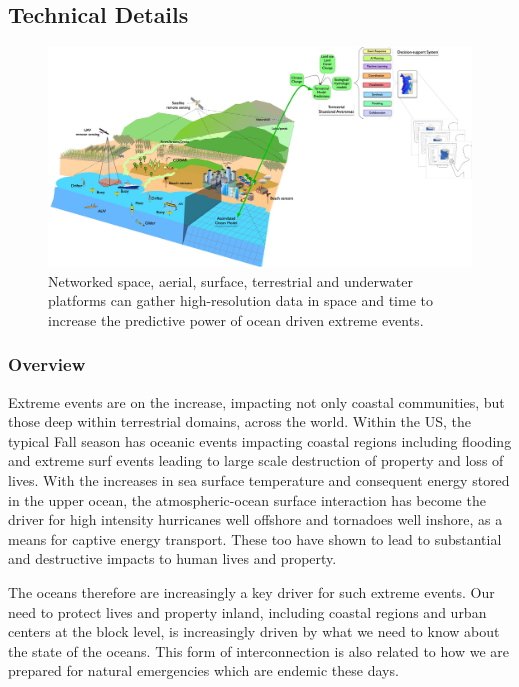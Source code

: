 \subsection*{Technical Details}

\begin{figure}
  \centering
  \includegraphics[scale=0.30]{fig/Coastal-connect.jpg}
  \caption{Networked space, aerial, surface, terrestrial and underwater
    platforms can gather high-resolution data in space and time to
    increase the predictive power of ocean driven extreme events.}
  \label{fig:coastal-res}
\end{figure}

\subsubsection*{Overview}

Extreme events are on the increase, impacting not only coastal
communities, but those deep within terrestrial domains, across the
world. Within the US, the typical Fall season has oceanic events
impacting coastal regions including flooding and extreme surf events
leading to large scale destruction of property and loss of lives. With
the increases in sea surface temperature and consequent energy stored
in the upper ocean, the atmospheric-ocean surface interaction has
become the driver for high intensity hurricanes well offshore and
tornadoes well inshore, as a means for captive energy transport. These
too have shown to lead to substantial and destructive impacts to human
lives and property. 

The oceans therefore are increasingly a key driver for such extreme
events. Our need to protect lives and property inland, including
coastal regions and urban centers at the block level, is increasingly
driven by what we need to know about the state of the oceans. This
form of interconnection is also related to how we are prepared for
natural emergencies which are endemic these days.

